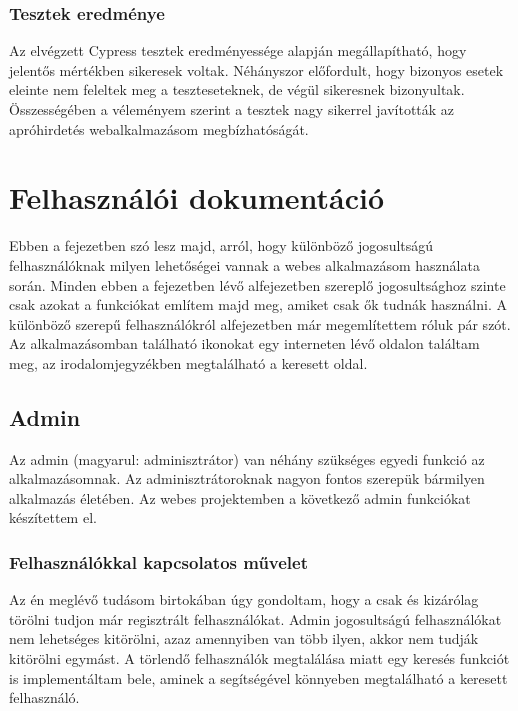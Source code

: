 \documentclass[]{thesis-ekf}
\theoremstyle{definition}
\theoremstyle{remark}
\begin{document}
	\subsection{Tesztek eredménye}
		Az elvégzett Cypress tesztek eredményessége alapján megállapítható, hogy jelentős mértékben sikeresek voltak. Néhányszor előfordult, hogy bizonyos esetek eleinte nem feleltek meg a teszteseteknek, de végül sikeresnek bizonyultak. Összességében a véleményem szerint a tesztek nagy sikerrel javították az apróhirdetés webalkalmazásom megbízhatóságát.   
		
	\chapter{Felhasználói dokumentáció}\label{ch-felhasznaloi}
		Ebben a fejezetben szó lesz majd, arról, hogy különböző jogosultságú felhasználóknak milyen lehetőségei vannak a webes alkalmazásom használata során. Minden ebben a fejezetben lévő alfejezetben szereplő jogosultsághoz szinte csak azokat a funkciókat említem majd meg, amiket csak ők tudnák használni. A különböző szerepű felhasználókról \az{\ref{sc-plantuml}} alfejezetben már megemlítettem róluk pár szót. Az alkalmazásomban található ikonokat egy interneten lévő oldalon találtam meg, az irodalomjegyzékben megtalálható a keresett oldal.\cite{Ikon} 
	\section{Admin}
		Az admin (magyarul: adminisztrátor) van néhány szükséges egyedi funkció az alkalmazásomnak. Az adminisztrátoroknak nagyon fontos szerepük bármilyen alkalmazás életében. Az webes projektemben a következő admin funkciókat készítettem el.
	\subsection{Felhasználókkal kapcsolatos művelet}
		Az én meglévő tudásom birtokában úgy gondoltam, hogy a csak és kizárólag törölni tudjon már regisztrált felhasználókat. Admin jogosultságú felhasználókat nem lehetséges kitörölni, azaz amennyiben van több ilyen, akkor nem tudják kitörölni egymást. A törlendő felhasználók megtalálása miatt egy keresés funkciót is implementáltam bele, aminek a segítségével könnyeben megtalálható a keresett felhasználó.
\end{document}
